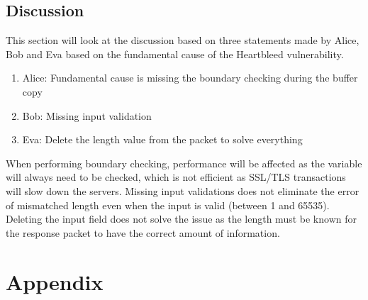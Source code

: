 \documentclass[a4paper,12pt]{article}
\begin{document}
\subsection{Discussion}
This section will look at the discussion based on three statements made by Alice, Bob and Eva based on the fundamental cause of the Heartbleed vulnerability.
\begin{enumerate}
	\itemsep0em
	\item Alice: Fundamental cause is missing the boundary checking during the buffer copy
	\item Bob: Missing input validation
	\item Eva: Delete the length value from the packet to solve everything
\end{enumerate}
When performing boundary checking, performance will be affected as the variable will always need to be checked, which is not efficient as SSL/TLS transactions will slow down the servers. Missing input validations does not eliminate the error of mismatched length even when the input is valid (between 1 and 65535). Deleting the input field does not solve the issue as the length must be known for the response packet to have the correct amount of information.
\newpage
\section{Appendix}
\end{document}

